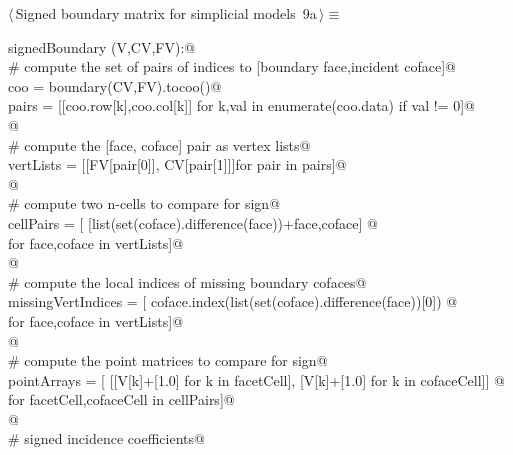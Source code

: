 \documentclass[11pt,oneside]{article}	%
\begin{document}
\begin{flushleft} \small
\begin{minipage}{\linewidth} \label{scrap21}
\protect{}$\langle\,$Signed boundary matrix for simplicial models\nobreak\ {\footnotesize 9a}$\,\rangle\equiv$
\vspace{-1ex}
\begin{list}{}{} \item
\mbox{}\verb@def signedBoundary (V,CV,FV):@\\
\mbox{}\verb@   # compute the set of pairs of indices to [boundary face,incident coface]@\\
\mbox{}\verb@   coo = boundary(CV,FV).tocoo()@\\
\mbox{}\verb@   pairs = [[coo.row[k],coo.col[k]] for k,val in enumerate(coo.data) if val != 0]@\\
\mbox{}\verb@   @\\
\mbox{}\verb@   # compute the [face, coface] pair as vertex lists@\\
\mbox{}\verb@   vertLists = [[FV[pair[0]], CV[pair[1]]]for pair in pairs]@\\
\mbox{}\verb@   @\\
\mbox{}\verb@   # compute two n-cells to compare for sign@\\
\mbox{}\verb@   cellPairs = [ [list(set(coface).difference(face))+face,coface] @\\
\mbox{}\verb@               for face,coface in vertLists]@\\
\mbox{}\verb@   @\\
\mbox{}\verb@   # compute the local indices of missing boundary cofaces@\\
\mbox{}\verb@   missingVertIndices = [ coface.index(list(set(coface).difference(face))[0]) @\\
\mbox{}\verb@                     for face,coface in vertLists]@\\
\mbox{}\verb@   @\\
\mbox{}\verb@   # compute the point matrices to compare for sign@\\
\mbox{}\verb@   pointArrays = [ [[V[k]+[1.0] for k in facetCell], [V[k]+[1.0] for k in cofaceCell]] @\\
\mbox{}\verb@               for facetCell,cofaceCell in cellPairs]@\\
\mbox{}\verb@   @\\
\mbox{}\verb@   # signed incidence coefficients@\\

\end{list}
\end{minipage}
\end{flushleft}
\end{document}
